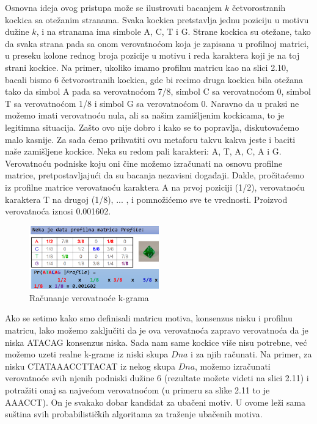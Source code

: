 Osnovna ideja ovog pristupa može se ilustrovati bacanjem $k$ četvorostranih kockica sa otežanim stranama. Svaka kockica pretstavlja jednu poziciju u motivu dužine $k$, i na stranama ima simbole A, C, T i G. Strane kockica su otežane, tako da svaka strana pada sa onom verovatnoćom koja je zapisana u profilnoj matrici, u preseku kolone rednog broja pozicije u motivu i reda karaktera koji je na toj strani kockice. Na primer, ukoliko imamo profilnu matricu kao na slici 2.10, bacali bismo 6 četvorostranih kockica, gde bi recimo druga kockica bila otežana tako da simbol A pada sa verovatnoćom 7/8, simbol C sa verovatnoćom 0, simbol T sa verovatnoćom 1/8 i simbol G sa verovatnoćom 0. Naravno da u praksi ne možemo imati verovatnoću nula, ali sa našim zamišljenim kockicama, to je legitimna situacija. Zašto ovo nije dobro i kako se to popravlja, diskutovaćemo malo kasnije. Za sada ćemo prihvatiti ovu metaforu takvu kakva jeste i baciti naše zamišljene kockice. 
Neka su redom pali karakteri: A, T, A, C, A i G. Verovatnoću podniske koju oni čine možemo izračunati na osnovu profilne matrice, pretpostavljajući da su bacanja nezavisni događaji. Dakle, pročitaćemo iz profilne matrice verovatnoću karaktera A na prvoj poziciji (1/2), verovatnoću karaktera T na drugoj (1/8), ... , i pomnožićemo sve te vrednosti. Proizvod verovatnoća iznosi 0.001602.

\begin{figure}[h]
\caption{Računanje verovatnoće k-grama}
\centering
\includegraphics[width=0.5\textwidth]{poglavlja/2/slike/61.PNG}
\end{figure}

 Ako se setimo kako smo definisali matricu motiva, konsenzus nisku i profilnu matricu, lako možemo zaključiti da je ova verovatnoća zapravo verovatnoća da je niska ATACAG konsenzus niska. Sada nam same kockice više nisu potrebne, već možemo uzeti realne k-grame iz niski skupa $Dna$ i za njih računati. Na primer, za nisku CTATAAACCTTACAT iz nekog skupa $Dna$, možemo izračunati verovatnoće svih njenih podniski dužine 6 (rezultate možete videti na slici 2.11) i potražiti onaj sa najvećom verovatnoćom (u primeru sa slike 2.11 to je AAACCT). On je svakako dobar kandidat za ubačeni motiv. U ovome leži sama suština svih probabilističkih algoritama za traženje ubačenih motiva.

